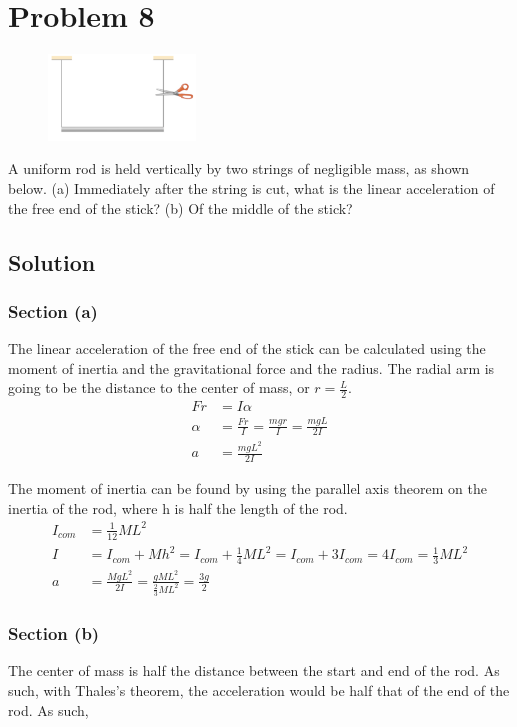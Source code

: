 \documentclass[12pt]{article}
\begin{document}
\pagebreak
\section{Problem 8}
\begin{figure}
    \vspace{-30pt}
    \includegraphics[width=0.35\textwidth]{graph_8.png} 
\end{figure}
A uniform rod is held vertically by two strings of negligible mass, as shown below. (a) Immediately after the string is cut, what is the linear acceleration of the free end of the stick? (b) Of the middle of the stick?

\subsection{Solution}
\subsubsection{Section (a)}
The linear acceleration of the free end of the stick can be calculated using the moment of inertia and the gravitational force and the radius. The radial arm is going to be the distance to the center of mass, or $r = \frac{L}{2}$.
\begin{align}
    Fr  &=  I\alpha\\
    \alpha  &=  \frac{Fr}{I}
        =   \frac{mgr}{I}
        =   \frac{mgL}{2I}\\
    a   &=  \frac{mgL^2}{2I}
\end{align}

The moment of inertia can be found by using the parallel axis theorem on the inertia of the rod, where h is half the length of the rod.
\begin{align}
    I_{com} &=  \frac{1}{12}ML^2\\
    I   &=  I_{com} + Mh^2
        =   I_{com} + \frac{1}{4}ML^2
        =   I_{com} + 3I_{com}
        =   4I_{com}
        =   \frac{1}{3}ML^2\\
    a   &=  \frac{MgL^2}{2I}
        =   \frac{gML^2}{\frac{2}{3}ML^2}
        =   \boxed{\frac{3g}{2}}
\end{align}

\subsubsection{Section (b)}
The center of mass is half the distance between the start and end of the rod. As such, with Thales's theorem, the acceleration would be half that of the end of the rod. As such, 
\end{document}
